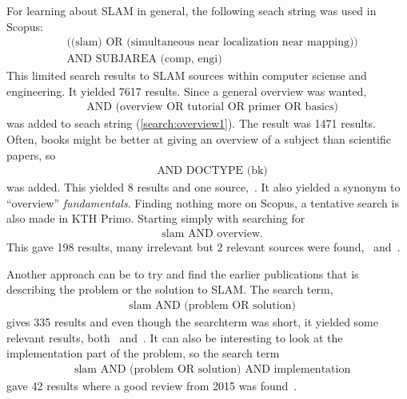 For learning about SLAM in general, the following seach string was used in Scopus:
\begin{align}
    \label{search:overview1}
    &\text{((slam) OR (simultaneous near localization near mapping))}\nonumber \\
    &\text{AND SUBJAREA (comp, engi)}
\end{align}
This limited search results to SLAM sources within computer sciense and
engineering. It yielded 7617 results. Since a general overview was wanted, 
\begin{align}
    \label{search:overview2}
    &\text{AND (overview OR tutorial OR primer OR basics)}
\end{align}
was added to seach string (\ref{search:overview1}). The result was 1471 results.
Often, books might be better at giving an overview of a subject than scientific
papers, so
\begin{align}
    \label{search:overview3}
    &\text{AND DOCTYPE (bk)}
\end{align}
was added. This yielded 8 results and one source,~\cite{Kernbach20131}. It also
yielded a synonym to ``overview'' \textit{fundamentals}. 
Finding nothing more on Scopus, a tentative search is also made in KTH Primo.
Starting  simply with searching for
\begin{align}
    \label{search:overview4}
    &\text{slam AND overview}.
\end{align}
This gave 198 results, many irrelevant but 2 relevant sources were
found,~\cite{Frese2010} and~\cite{5769022}.

Another approach can be to try and find the earlier publications that is
describing the problem or the solution to SLAM\@. The search term,
\begin{align}
    \label{search:overview5}
    &\text{slam AND (problem OR solution)} 
\end{align}
gives 335 results and even though the searchterm was short, it yielded some
relevant results, both~\cite{938381} and~\cite{844732}. It can also be
interesting to look at the implementation part of the problem, so the search
term
\begin{align}
    \label{search:overview6}
    &\text{slam AND (problem OR solution) AND implementation} 
\end{align}
gave 42 results where a good review from 2015 was found~\cite{7482163}.
